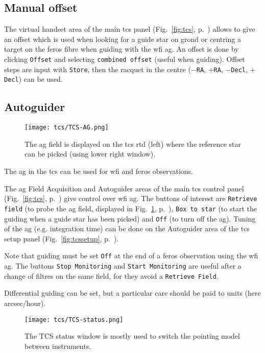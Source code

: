 \documentclass[11pt,fleqn]{book}
\def\figref#1{Fig.~\ref{fig:#1}, p.~\pageref{fig:#1}}
\begin{document}
\subsection{Manual offset}
\label{manualoffset}

The virtual handset area of the main \gls{tcs} panel (\figref{tcs})
allows to give an offset which is used when looking for a guide star on
\gls{grond} or centring a target on the \gls{feros} fibre when guiding with the
\gls{wfi} \gls{ag}.  An offset is done by clicking \texttt{Offset} and
selecting \texttt{combined offset} (useful when guiding).  Offset steps are
input with \texttt{Store}, then the racquet in the centre (\texttt{$-$RA},
\texttt{$+$RA}, \texttt{$-$Decl}, \texttt{$+$Decl}) can be used.

\subsection{Autoguider}
\label{autoguider}

\begin{figure}[!ht]
\centering
\texttt{[image: tcs/TCS-AG.png]}
\caption[WFI autoguider]{The \gls{ag} field is displayed on the \gls{tcs} \gls{rtd} (left) where the
 reference star can be picked (using lower right window).} 
\label{fig:tcsag}
\end{figure}
The \gls{ag} in the \gls{tcs} can be used for \gls{wfi} and \gls{feros} observations.

The \gls{ag} Field Acquisition and Autoguider areas of the main \gls{tcs} control panel
(\figref{tcs}) give control over \gls{wfi} \gls{ag}.  The buttons of
interest are \texttt{Retrieve field} (to probe the \gls{ag} field, displayed
in \figref{tcsag}), \texttt{Box to
star} (to start the guiding when a guide star has been picked) and \texttt{Off}
(to turn off the \gls{ag}).  Tuning of the \gls{ag} (e.g. integration time) can be done 
on  the Autoguider area of the \gls{tcs} setup panel (\figref{tcssetup}).

Note that guiding must be set \texttt{Off} at the end of a \gls{feros} observation
using the \gls{wfi} \gls{ag}. The buttons \texttt{Stop Monitoring} and \texttt{Start Monitoring} are
useful after a change of filtres on the same field, for they avoid
a \texttt{Retrieve Field}.

Differential guiding can be set, but a particular care should be paid
to units (here arcsec/hour).


\begin{figure}[!ht]
\centering
\texttt{[image: tcs/TCS-status.png]}
\caption[Status window of the telescope control software]{The TCS status window is mostly used to switch the pointing model
between instruments.}
\label{fig:tcsstatus}
\end{figure}
\end{document}
